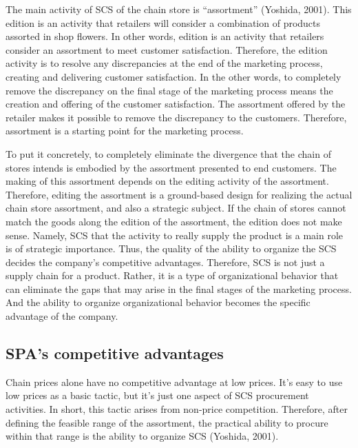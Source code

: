 \documentclass[12pt,]{article}
\begin{document}
The main activity of SCS of the chain store is ``assortment'' (Yoshida,
2001). This edition is an activity that retailers will consider a
combination of products assorted in shop flowers. In other words,
edition is an activity that retailers consider an assortment to meet
customer satisfaction. Therefore, the edition activity is to resolve any
discrepancies at the end of the marketing process, creating and
delivering customer satisfaction. In the other words, to completely
remove the discrepancy on the final stage of the marketing process means
the creation and offering of the customer satisfaction. The assortment
offered by the retailer makes it possible to remove the discrepancy to
the customers. Therefore, assortment is a starting point for the
marketing process.

To put it concretely, to completely eliminate the divergence that the
chain of stores intends is embodied by the assortment presented to end
customers. The making of this assortment depends on the editing activity
of the assortment. Therefore, editing the assortment is a ground-based
design for realizing the actual chain store assortment, and also a
strategic subject. If the chain of stores cannot match the goods along
the edition of the assortment, the edition does not make sense. Namely,
SCS that the activity to really supply the product is a main role is of
strategic importance. Thus, the quality of the ability to organize the
SCS decides the company's competitive advantages. Therefore, SCS is not
just a supply chain for a product. Rather, it is a type of
organizational behavior that can eliminate the gaps that may arise in
the final stages of the marketing process. And the ability to organize
organizational behavior becomes the specific advantage of the company.

\hypertarget{spas-competitive-advantages}{%
\subsection{SPA's competitive
advantages}\label{spas-competitive-advantages}}

Chain prices alone have no competitive advantage at low prices. It's
easy to use low prices as a basic tactic, but it's just one aspect of
SCS procurement activities. In short, this tactic arises from non-price
competition. Therefore, after defining the feasible range of the
assortment, the practical ability to procure within that range is the
ability to organize SCS (Yoshida, 2001).
\end{document}
